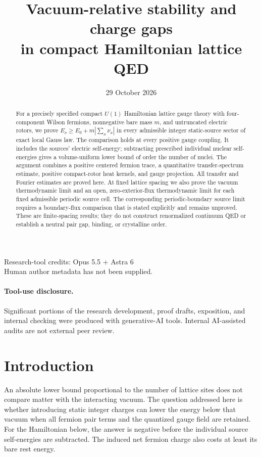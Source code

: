 \documentclass[11pt,letterpaper]{article}
\title{Vacuum-relative stability and charge gaps\\in compact Hamiltonian lattice QED}
\author{}
\date{29 October 2026}
\numberwithin{equation}{section}
\theoremstyle{remark}
\begin{document}
\maketitle
\begin{center}
\small Research-tool credits: Opus 5.5 + Astra 6\\
Human author metadata has not been supplied.
\end{center}
\begin{abstract}
For a precisely specified compact $U(1)$ Hamiltonian lattice gauge theory
with four-component Wilson fermions, nonnegative bare mass $m$, and
untruncated electric rotors, we prove
$E_\nu\ge E_0+m|\sum_x\nu_x|$ in every admissible integer static-source
sector of exact local Gauss law. The comparison holds at every positive
gauge coupling. It includes the sources' electric self-energy;
subtracting prescribed individual nuclear self-energies gives a
volume-uniform lower bound of order the number of nuclei.
The argument combines a positive centered fermion trace, a quantitative
transfer-spectrum estimate, positive compact-rotor heat kernels, and
gauge projection. All transfer and Fourier estimates are proved here.
At fixed lattice spacing we also prove the vacuum thermodynamic limit
and an open, zero-exterior-flux thermodynamic limit for each fixed
admissible periodic source cell. The corresponding periodic-boundary
source limit requires a boundary-flux comparison that is stated
explicitly and remains unproved. These are finite-spacing results;
they do not construct renormalized continuum QED or establish a
neutral pair gap, binding, or crystalline order.
\end{abstract}

\paragraph{Tool-use disclosure.}
Significant portions of the research development, proof drafts,
exposition, and internal checking were produced with generative-AI
tools. Internal AI-assisted audits are not external peer review.

\section{Introduction}
An absolute lower bound proportional to the number of lattice sites
does not compare matter with the interacting vacuum. The question
addressed here is whether introducing static integer charges can
lower the energy below that vacuum when all fermion pair terms and
the quantized gauge field are retained. For the Hamiltonian below,
the answer is negative before the individual source self-energies
are subtracted. The induced net fermion charge also costs at least
its bare rest energy.
\end{document}
